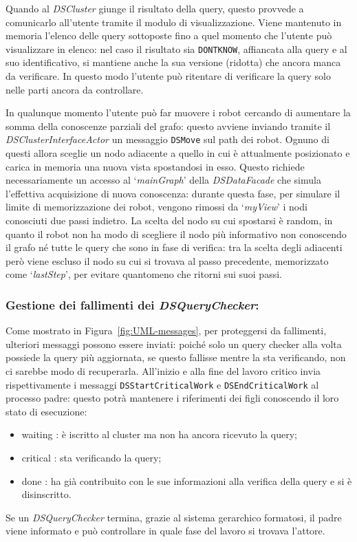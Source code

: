 Quando al \emph{DSCluster} giunge il risultato della query,
questo provvede a comunicarlo all'utente tramite il modulo di
visualizzazione. Viene mantenuto in memoria l'elenco delle
query sottoposte fino a quel momento che l'utente può visualizzare
in elenco: nel caso il risultato sia \texttt{DONTKNOW}, affiancata
alla query e al suo identificativo, si mantiene anche la sua versione
(ridotta) che ancora manca da verificare. In questo modo
l'utente può ritentare di verificare la query solo nelle parti
ancora da controllare.

In qualunque momento l'utente può far muovere i robot cercando di
aumentare la somma della conoscenze parziali del grafo: questo
avviene inviando tramite il \emph{DSClusterInterfaceActor} un
messaggio \texttt{DSMove} sul path dei robot.
Ognuno di questi allora sceglie un nodo adiacente
a quello in cui è attualmente posizionato e carica in memoria
una nuova vista spostandosi in esso.
Questo richiede necessariamente un accesso al `\emph{mainGraph}' della
\emph{DSDataFacade} che simula l'effettiva acquisizione di
nuova conoscenza: durante questa fase, per simulare il limite di
memorizzazione dei robot, vengono rimossi da `\emph{myView}'
i nodi conosciuti due passi indietro.
La scelta del nodo su cui spostarsi è random, in quanto il robot
non ha modo di scegliere il nodo più informativo non conoscendo
il grafo né tutte le query che sono in fase di verifica:
tra la scelta degli adiacenti però viene escluso il nodo su cui
si trovava al passo precedente, memorizzato come
`\emph{lastStep}', per evitare quantomeno che ritorni sui suoi passi.

\subsubsection*{Gestione dei fallimenti dei \emph{DSQueryChecker}:}
Come mostrato in Figura~\ref{fig:UML-messages},
per proteggersi da fallimenti, ulteriori messaggi possono essere
inviati: poiché solo un query checker alla volta possiede la query
più aggiornata, se questo fallisse mentre la sta verificando,
non ci sarebbe modo di recuperarla.
All'inizio e alla fine del lavoro critico invia rispettivamente i
messaggi \texttt{DSStartCriticalWork} e \texttt{DSEndCriticalWork}
al processo padre: questo potrà mantenere i riferimenti dei
figli conoscendo il loro stato di esecuzione:\begin{itemize}
\item waiting : è iscritto al cluster ma non ha ancora ricevuto la query;
\item critical : sta verificando la query;
\item done : ha già contribuito con le sue informazioni alla verifica
  della query e si è disinscritto.
\end{itemize}
Se un \emph{DSQueryChecker} termina, grazie al sistema gerarchico
formatosi, il padre viene informato e può controllare in quale fase del
lavoro si trovava l'attore.

